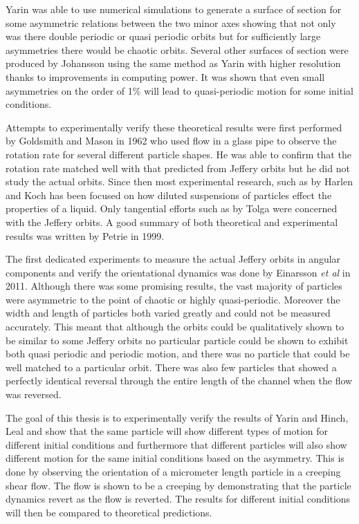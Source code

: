 Yarin was able to use numerical simulations to generate a surface of section \cite{SurfaceOfSection} for some asymmetric relations between the two minor axes showing that not only was there double periodic or quasi periodic orbits but for sufficiently large asymmetries there would be chaotic orbits. 
Several other surfaces of section were produced by Johansson \cite{AntonThesis} using the same method as Yarin with higher resolution thanks to improvements in computing power. It was shown that even small asymmetries on the order of 1\% will lead to quasi-periodic motion for some initial conditions.

Attempts to experimentally verify these theoretical results were first performed by Goldsmith and Mason in 1962\cite{Mason} who used flow in a glass pipe to observe the rotation rate for several different particle shapes. He was able to confirm that the rotation rate matched well with that predicted from Jeffery orbits but he did not study the actual orbits. Since then most experimental research, such as by Harlen and Koch\cite{fibersspension} has been focused on how diluted suspensions of particles effect the properties of a liquid. Only tangential efforts such as by Tolga\cite{Tolga} were concerned with the Jeffery orbits. A good summary of both theoretical and experimental results was written by Petrie\cite{Petrie} in 1999.

The first dedicated experiments to measure the actual Jeffery orbits in angular components and verify the orientational 
dynamics was done by Einarsson \emph{et al} \cite{JonasExperiment} in 2011. Although there was some promising results, the vast majority of particles were asymmetric to the point of chaotic or highly quasi-periodic. Moreover the width and 
length of particles both varied greatly and could not be measured accurately.
This meant that although the orbits could be qualitatively shown to be similar to some 
Jeffery orbits no particular particle could be shown to exhibit both quasi periodic and periodic motion, and there was 
no particle that could be well matched to a particular orbit. There was also few particles that showed a 
perfectly identical reversal through the entire length of the channel when the flow was reversed.


The goal of this thesis is to experimentally verify the results of Yarin and Hinch, Leal\cite{Yarin, Leal} and show that the same particle will show different types of motion for different initial conditions and furthermore that different particles will also show different motion for the same initial conditions based on the asymmetry. This is done by observing the orientation of a micrometer length particle in a creeping shear flow. The flow is shown to be a creeping by demonstrating that the particle dynamics revert as the flow is reverted. The results for different initial conditions will then be compared to theoretical predictions.

